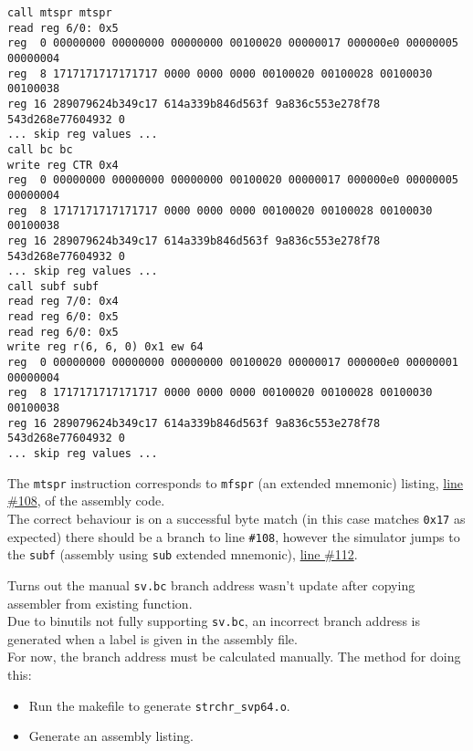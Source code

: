 \begin{verbatim}
call mtspr mtspr
read reg 6/0: 0x5
reg  0 00000000 00000000 00000000 00100020 00000017 000000e0 00000005 00000004
reg  8 1717171717171717 0000 0000 0000 00100020 00100028 00100030 00100038
reg 16 289079624b349c17 614a339b846d563f 9a836c553e278f78 543d268e77604932 0
... skip reg values ...
call bc bc
write reg CTR 0x4
reg  0 00000000 00000000 00000000 00100020 00000017 000000e0 00000005 00000004
reg  8 1717171717171717 0000 0000 0000 00100020 00100028 00100030 00100038
reg 16 289079624b349c17 614a339b846d563f 9a836c553e278f78 543d268e77604932 0
... skip reg values ...
call subf subf
read reg 7/0: 0x4
read reg 6/0: 0x5
read reg 6/0: 0x5
write reg r(6, 6, 0) 0x1 ew 64
reg  0 00000000 00000000 00000000 00100020 00000017 000000e0 00000001 00000004
reg  8 1717171717171717 0000 0000 0000 00100020 00100028 00100030 00100038
reg 16 289079624b349c17 614a339b846d563f 9a836c553e278f78 543d268e77604932 0
... skip reg values ...
\end{verbatim}

The \texttt{mtspr} instruction corresponds to \texttt{mfspr}
(an extended mnemonic) listing,
\href{https://github.com/ngisearchsvp64/glibc-svp64/blob/9378006a84bdef6af85eb0f810fb62fedc62c588/svp64-port/svp64/strchr_svp64.s#L108}{line \#108},
of the assembly code.\\

The correct behaviour is on a successful byte match (in this case
matches \texttt{0x17} as expected) there should be a branch to line
\texttt{\#108}, however the simulator jumps to the \texttt{subf}
(assembly using \texttt{sub} extended mnemonic),
\href{https://github.com/ngisearchsvp64/glibc-svp64/blob/9378006a84bdef6af85eb0f810fb62fedc62c588/svp64-port/svp64/strchr_svp64.s#L112}{line \#112}.\\

\label{subsubsec:wrong_val_man_addr}

Turns out the manual \texttt{sv.bc} branch address wasn't update after
copying assembler from existing function.\\

Due to binutils not fully supporting \texttt{sv.bc}, an incorrect
branch address is generated when a label is given in the assembly file.\\

For now, the branch address must be calculated manually.
The method for doing this:

\begin{itemize}
  \item Run the makefile to generate \texttt{strchr\_svp64.o}.
  \item Generate an assembly listing.
\end{itemize}

